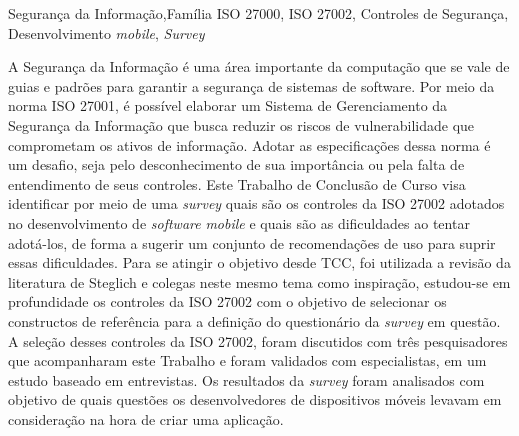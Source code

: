 \documentclass[portuguese,oneside]{tcc}
\begin{document}
\begin{resumo}{Segurança da Informação,Família ISO 27000, ISO 27002, Controles de Segurança, Desenvolvimento \textit{mobile}, \textit{Survey}}

 A Segurança da Informação é uma área importante da computação que se vale de guias e padrões para garantir a segurança de sistemas de software. Por meio da norma ISO 27001, é possível elaborar um Sistema de Gerenciamento da Segurança da Informação que busca reduzir os riscos de vulnerabilidade que comprometam os ativos de informação. Adotar as especificações dessa norma é um desafio, seja pelo desconhecimento de sua importância ou pela falta de entendimento de seus controles. Este Trabalho de Conclusão de Curso visa identificar por meio de uma \textit{survey} quais são os controles da ISO 27002 adotados no desenvolvimento de \textit{software} \textit{mobile} e quais são as dificuldades ao tentar adotá-los, de forma a sugerir um conjunto de recomendações de uso para suprir essas dificuldades. Para se atingir o objetivo desde TCC, foi utilizada a revisão da literatura de Steglich e colegas \cite{caio2019} neste mesmo tema como inspiração, estudou-se em profundidade os controles da ISO 27002 com o objetivo de selecionar os constructos de referência para a definição do questionário da \textit{survey} em questão.  A seleção desses controles da ISO 27002, foram discutidos com três pesquisadores que acompanharam este Trabalho e foram validados com especialistas, em um estudo baseado em entrevistas. Os resultados da \textit{survey} foram analisados com objetivo de quais questões os desenvolvedores de dispositivos móveis levavam em consideração na hora de criar uma aplicação.
 

 
 




\end{resumo}
\end{document}
